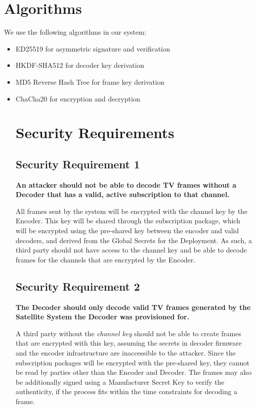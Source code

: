 \documentclass[12pt]{article}
\begin{document}
\section*{Algorithms}
We use the following algorithms in our system:
\begin{itemize}
  \item ED25519 for asymmetric signature and verification
  \item HKDF-SHA512 for decoder key derivation
  \item MD5 Reverse Hash Tree for frame key derivation
  \item ChaCha20 for encryption and decryption

\section*{Security Requirements}

\subsection*{Security Requirement 1}
\textbf{An attacker should not be able to decode TV frames without a Decoder that has a valid, active subscription to that channel.}

All frames sent by the system will be encrypted with the channel key by the Encoder. This key will be shared through the subscription package, which will be encrypted using the pre-shared key between the encoder and valid decoders, and derived from the Global Secrets for the Deployment. As such, a third party should not have access to the channel key and be able to decode frames for the channels that are encrypted by the Encoder.

\subsection*{Security Requirement 2}
\textbf{The Decoder should only decode valid TV frames generated by the Satellite System the Decoder was provisioned for.}

A third party without the \textit{channel key} should not be able to create frames that are encrypted with this key, assuming the secrets in decoder firmware and the encoder infrastructure are inaccessible to the attacker. Since the subscription packages will be encrypted with the pre-shared key, they cannot be read by parties other than the Encoder and Decoder. The frames may also be additionally signed using a Manufacturer Secret Key to verify the authenticity, if the process fits within the time constraints for decoding a frame.


\end{itemize}
\end{document}
